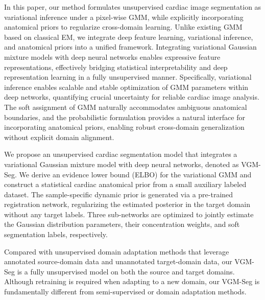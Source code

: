 \documentclass[preprint,12pt]{elsarticle}
\begin{document}
In this paper, our method formulates unsupervised cardiac image segmentation as variational inference under a pixel-wise GMM, while explicitly incorporating anatomical priors to regularize cross-domain learning. Unlike existing GMM based on classical EM, we integrate deep feature learning, variational inference, and anatomical priors into a unified framework.
Integrating variational Gaussian mixture models with deep neural networks enables expressive feature representations, effectively bridging statistical interpretability and deep representation learning in a fully unsupervised manner.
Specifically, variational inference enables scalable and stable optimization of GMM parameters within deep networks, quantifying crucial uncertainty for reliable cardiac image analysis.
The soft assignment of GMM naturally accommodates ambiguous anatomical boundaries, and the probabilistic formulation provides a natural interface for incorporating anatomical priors, enabling robust cross-domain generalization without explicit domain alignment.



We propose an unsupervised cardiac segmentation model that integrates a variational Gaussian mixture model with deep neural networks, denoted as VGM-Seg. 
%
We derive an evidence lower bound (ELBO) for the variational GMM and construct a statistical cardiac anatomical prior from a small auxiliary labeled dataset. The sample-specific dynamic prior is generated via a pre-trained registration network, regularizing the estimated posterior in the target domain without any target labels. 
Three sub-networks are optimized to jointly estimate the Gaussian distribution parameters, their concentration weights, and soft segmentation labels, respectively. 


Compared with unsupervised domain adaptation methods that leverage annotated source-domain data and unannotated target-domain data, our VGM-Seg is a fully unsupervised model on both the source and target domains. Although retraining is required when adapting to a new domain, our VGM-Seg is fundamentally different from semi-supervised or domain adaptation methods.
\end{document}
